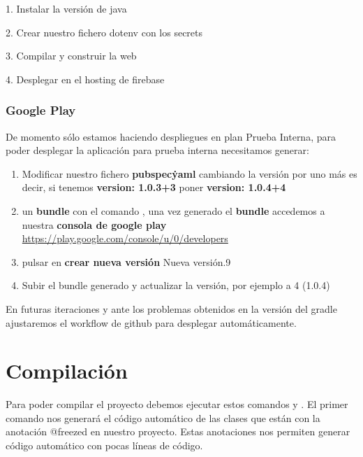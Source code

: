 1. Instalar la versión de java

2. Crear nuestro fichero dotenv con los secrets

3. Compilar y construir la web

4. Desplegar en el hosting de firebase

\subsubsection{Google Play}
De momento sólo estamos haciendo despliegues en plan Prueba Interna, para poder desplegar la aplicación para prueba interna necesitamos generar:
\begin{enumerate}
	\item Modificar nuestro fichero \textbf{pubspec\.yaml} cambiando la versión por uno más es decir, si tenemos \textbf{version: 1.0.3+3} poner \textbf{version: 1.0.4+4}
	\item un \textbf{bundle} con el comando \fboxrule=1pt\fboxsep=4pt, una vez generado el \textbf{bundle} accedemos a nuestra \textbf{consola de google play} \url{https://play.google.com/console/u/0/developers}
	\item pulsar en \textbf{crear nueva versión}
 {Nueva versión}{.9}
	\item Subir el bundle generado y actualizar la versión, por ejemplo a 4 (1.0.4)
\end{enumerate}

En futuras iteraciones y ante los problemas obtenidos en la versión del gradle ajustaremos el workflow de github para desplegar automáticamente.

\section{Compilación}
Para poder compilar el proyecto debemos ejecutar estos comandos \fboxrule=1pt\fboxsep=4pt y \fboxrule=1pt\fboxsep=4pt. El primer comando nos generará el código automático de las clases que están con la anotación @freezed en nuestro proyecto. Estas anotaciones nos permiten generar código automático con pocas líneas de código.

